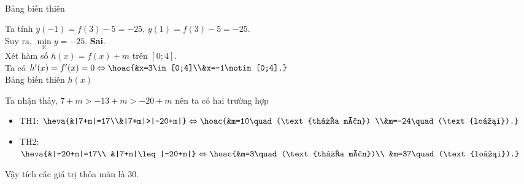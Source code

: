 \begin{ex}
{\begin{itemchoice}
\begin{align*}
\end{align*}
Bảng biến thiên
\begin{center}
\end{center}
Ta tính $y(-1)=f(3)-5=-25$, $y(1)=f(3)-5=-25$.\\
Suy ra, $\min\limits_{\mathbb{R}}y=-25$.
\itemch \textbf{Sai}.\\
Xét hàm số $h(x)=f(x)+m$ trên $[0;4]$.\\
Ta có $h'(x)=f'(x)=0\Leftrightarrow \hoac{&x=3\in[0;4]\\&x=-1\notin[0;4].}$\\
Bảng biến thiên $h(x)$
\begin{center}
\end{center}
Ta nhận thấy, $7+m>-13+m>-20+m$ nên ta có hai trường hợp
\begin{itemize}
\item TH1: $\heva{&|7+m|=17\\&|7+m|>|-20+m|} \Leftrightarrow\hoac{&m=10\quad(\text{thỏa mãn}) \\&m=-24\quad (\text{loại}).}$
\item TH2: $\heva{&|-20+m|=17\\ &|7+m|\leq|-20+m|} \Leftrightarrow\hoac{&m=3\quad(\text{thỏa mãn})\\ &m=37\quad (\text{loại}).}$
\end{itemize}
Vậy tích các giá trị thỏa mãn là $30$.
\end{itemchoice}
}
\end{ex}

